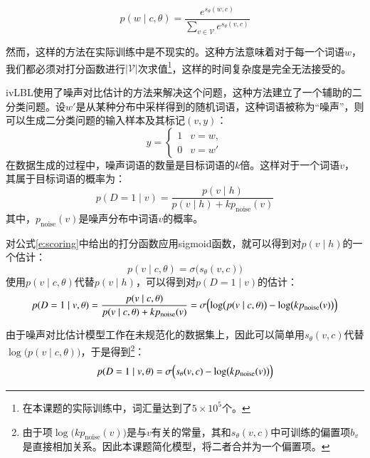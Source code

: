 \begin{equation}
p(w \mid c, \theta) = \frac{e^{s_\theta(w, c)}}{\sum_{v \in \mathcal{V}}e^{s_\theta(v, c)}}
\label{e:softmax}
\end{equation}

然而，这样的方法在实际训练中是不现实的。这种方法意味着对于每一个词语$w$，我们都必须对打分函数进行$|\mathcal{V}|$次求值\footnote{在本课题的实际训练中，词汇量达到了$5 \times 10^5$个。}，这样的时间复杂度是完全无法接受的。

ivLBL使用了噪声对比估计的方法来解决这个问题，这种方法建立了一个辅助的二分类问题。设$w'$是从某种分布中采样得到的随机词语，这种词语被称为“噪声”，则可以生成二分类问题的输入样本及其标记$(v, y)$：
\begin{equation}
y = \begin{cases}
1 & v = w, \\
0 & v = w'
\end{cases}
\end{equation}
在数据生成的过程中，噪声词语的数量是目标词语的$k$倍。这样对于一个词语$v$，其属于目标词语的概率为：
\begin{equation}
p(D = 1 \mid v) = \frac{p(v \mid h)}{p(v \mid h) + k p_\text{noise}(v)}
\end{equation}
其中，$p_\text{noise}(v)$是噪声分布中词语$v$的概率。

对公式\ref{e:scoring}中给出的打分函数应用sigmoid函数，就可以得到对$p(v \mid h)$的一个估计：
\begin{equation}
p(v \mid c, \theta) = \sigma\bigl(s_\theta(v, c)\bigr)
\end{equation}
使用$p(v \mid c, \theta)$代替$p(v \mid h)$，可以得到对$p(D = 1 \mid v)$的估计：
\begin{equation}
p(D = 1 \mid v, \theta) = \frac{p(v \mid c, \theta)}{p(v \mid c, \theta) + k p_\text{noise}(v)} = \sigma\Bigl(\log\bigl(p(v \mid c, \theta)\bigr) - \log\bigl(k p_\text{noise}(v)\bigr)\Bigr)
\end{equation}

由于噪声对比估计模型工作在未规范化的数据集上，因此可以简单用$s_\theta(v, c)$代替$\log\bigl(p(v \mid c, \theta)\bigr)$，于是得到\footnote{由于项$\log\bigl(k p_\text{noise}(v)\bigr)$是与$v$有关的常量，其和$s_\theta(v, c)$中可训练的偏置项$b_v$是直接相加关系。因此本课题简化模型，将二者合并为一个偏置项。}：
\begin{equation}
p(D = 1 \mid v, \theta) = \sigma\Bigl(s_\theta(v, c) - \log\bigl(k p_\text{noise}(v)\bigr)\Bigr)
\end{equation}

